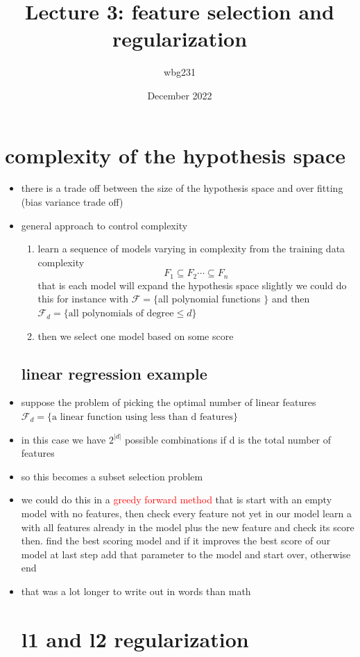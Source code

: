 \documentclass{article}
\title{Lecture 3: feature selection and regularization}
\author{wbg231 }
\date{December 2022}
\begin{document}
\maketitle

\section{complexity of the hypothesis space}
\begin{itemize}
\item there is a trade off between the size of the hypothesis space and over fitting (bias variance trade off)
\item general approach to control complexity
\begin{enumerate}
    \item learn a sequence of models varying in complexity from the training data complexity $$F_1\subseteq F_2\cdots \subseteq F_n$$that is each model will expand the hypothesis space slightly 
     we could do this for instance with $\mathcal{F}=\{$all polynomial functions  $ \}$ and then $\mathcal{F}_{d}=\{\text{all polynomials of degree}\leq d\}$
    \item  then we select one model based on some score
\end{enumerate}
\subsection*{linear regression example}
\item suppose the problem of picking the optimal number of linear features $\mathcal{F}_{d}=\{\text{a linear function using less than d features}\}$
\item in this case we have $2^|d|$ possible combinations if d is the total number of features
\item so this becomes a subset selection problem 
\item we could do this in a \textcolor{red}{greedy forward method} that is start with an empty model with no features, then check every feature not yet in our model learn a with all features already in the model plus the new feature and check its score then. find the best scoring model and if it improves the best score of our model at last step add that parameter to the model and start over, otherwise end 
\item that was a lot longer to write out in words than math 
\section*{l1 and l2 regularization}

\end{itemize}
\end{document}
